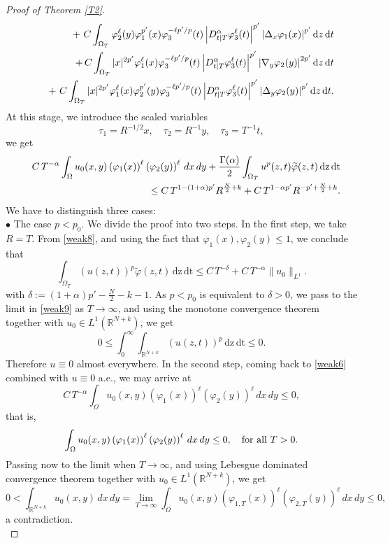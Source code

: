 \documentclass[reqno,11pt]{amsart}
\numberwithin{equation}{section}
\def\R{{\mathbb {R}}}
\def\R{\mathbb{R}}
\begin{document}
\begin{proof}[Proof of Theorem \ref{T2}]
\begin{eqnarray}
		&{}&\quad+\,\,C\int_{\Omega_T}\varphi_2^\ell(y)\varphi_1^{p'}(x)\varphi_3^{-\ell p^\prime/p}(t)\left|D^{\alpha}_{t|T} \varphi^\ell_3(t)\right|^{p'}\left|\Delta_x \varphi_1(x)\right|^{p'}\mathrm{d}z\,\mathrm{d}t\notag\\
		&&\quad+\,C\int_{\Omega_T}|x|^{2p'}\varphi_1^\ell(x)\varphi_3^{-\ell p^\prime/p}(t)\left|D^{\alpha}_{t|T} \varphi^\ell_3(t)\right|^{p'}\left|\nabla_y \varphi_2(y)\right|^{2p'}\mathrm{d}z\,\mathrm{d}t\notag\\
		&{}&\quad+\,\,C\int_{\Omega_T}|x|^{2p'}\varphi_1^\ell(x)\varphi_2^{p'}(y)\varphi_3^{-\ell p^\prime/p}(t)\left|D^{\alpha}_{t|T} \varphi^\ell_3(t)\right|^{p'}\left|\Delta_y \varphi_2(y)\right|^{p'}\mathrm{d}z\,\mathrm{d}t.
	\end{eqnarray}
	At this stage, we introduce the scaled variables 
	\begin{equation}\label{changevar}
		\tau_1=R^{-1/2}x,\quad \tau_2=R^{-1}y,\quad \tau_3=T^{-1}t,	
	\end{equation} 
	we get
	\begin{eqnarray}\label{weak8}
		&&C\,T^{-\alpha}\int_{\Omega}u_0(x,y)\left(\varphi_1(x)\right)^\ell \left(\varphi_2(y)\right)^\ell\,dx\,dy+\frac{\Gamma(\alpha)}{2}\int_{\Omega_T}u^{p}(z,t)\widetilde{\varphi}(z,t)\,\mathrm{dz}\,\mathrm{dt}\notag\\
		&&\leq C\,T^{1-(1+\alpha)p'}R^{\frac{N}{2}+k}+C\,T^{1-\alpha p'}R^{-p'+\frac{N}{2}+k}.
	\end{eqnarray}
	We have to distinguish three cases:\\
	
	\noindent $\bullet$ The case $p<p_0$. We divide the proof into two steps. In the first step, we take $R=T$. From \eqref{weak8}, and using the fact that $\varphi_1(x),\varphi_2(y)\leq 1$, we conclude that
	\begin{equation}\label{weak9}
		\int_{\Omega_T}(u(z,t))^{p}\widetilde{\varphi}(z,t)\,\mathrm{dz}\,\mathrm{dt}\leq C\,T^{-\delta}+C\,T^{-\alpha}\|u_0\|_{L^1}.
	\end{equation}
	with $\delta:=(1+\alpha)p'-\frac{N}{2}-k-1$. As $p<p_0$ is equivalent to $\delta>0$, we pass to the limit in \eqref{weak9} as $T\rightarrow\infty$, and using the monotone convergence theorem together with $u_0\in L^1(\mathbb{R}^{N+k})$, we get
	$$0\leq \int_0^\infty\int_{\R^{N+k}}(u(z,t))^{p}\,\mathrm{dz}\,\mathrm{dt}\leq 0.$$
	Therefore $u\equiv 0$ almost everywhere. In the second step, coming back to \eqref{weak6} combined with $u\equiv0$ a.e., we may arrive at
	$$C\,T^{-\alpha}\int_{\Omega}u_0(x,y)\left(\varphi_1(x)\right)^\ell \left(\varphi_2(y)\right)^\ell \,dx\,dy\leq 0,$$
	that is,
	$$\int_{\Omega}u_0(x,y)\left(\varphi_1(x)\right)^\ell \left(\varphi_2(y)\right)^\ell \,dx\,dy\leq 0,\quad\hbox{for all}\,\,T>0.$$
	Passing now to the limit when $T\rightarrow\infty$, and using Lebesgue dominated convergence theorem together with $u_0\in L^1(\mathbb{R}^{N+k})$, we get
	\[
	0<\int_{\R^{N+k}}u_0(x,y)\,dx\,dy=\lim_{T\rightarrow\infty}\int_{\Omega}u_0(x,y)\left(\varphi_{1,T}(x)\right)^\ell \left(\varphi_{2,T}(y)\right)^\ell\,dx\,dy\leq 0 ,
	\]
	a contradiction.\\
	

\end{proof}
\end{document}
